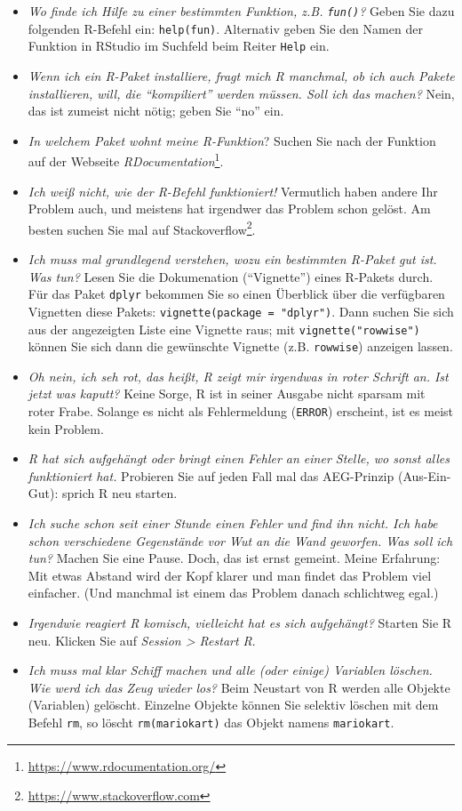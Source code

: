 \documentclass[
  a4paper,
]{scrbook}
\providecommand{\tightlist}{%
  \setlength{\itemsep}{0pt}\setlength{\parskip}{0pt}}\usepackage{longtable,booktabs,array}
\theoremstyle{definition}
\theoremstyle{definition}
\theoremstyle{definition}
\theoremstyle{remark}
\begin{document}
\begin{itemize}
\tightlist
\item
  \emph{Wo finde ich Hilfe zu einer bestimmten Funktion, z.B.
  \texttt{fun()}?} Geben Sie dazu folgenden R-Befehl ein:
  \texttt{help(fun)}. Alternativ geben Sie den Namen der Funktion in
  RStudio im Suchfeld beim Reiter \texttt{Help} ein.
\item
  \emph{Wenn ich ein R-Paket installiere, fragt mich R manchmal, ob ich
  auch Pakete installieren, will, die ``kompiliert'' werden müssen. Soll
  ich das machen?} Nein, das ist zumeist nicht nötig; geben Sie ``no''
  ein.
\item
  \emph{In welchem Paket wohnt meine R-Funktion}? Suchen Sie nach der
  Funktion auf der Webseite \emph{RDocumentation}\footnote{\url{https://www.rdocumentation.org/}}.
\item
  \emph{Ich weiß nicht, wie der R-Befehl funktioniert!} Vermutlich haben
  andere Ihr Problem auch, und meistens hat irgendwer das Problem schon
  gelöst. Am besten suchen Sie mal auf Stackoverflow\footnote{\url{https://www.stackoverflow.com}}.
\item
  \emph{Ich muss mal grundlegend verstehen, wozu ein bestimmten R-Paket
  gut ist. Was tun?} Lesen Sie die Dokumenation (``Vignette'') eines
  R-Pakets durch. Für das Paket \texttt{dplyr} bekommen Sie so einen
  Überblick über die verfügbaren Vignetten diese Pakets:
  \texttt{vignette(package\ =\ "dplyr")}. Dann suchen Sie sich aus der
  angezeigten Liste eine Vignette raus; mit \texttt{vignette("rowwise")}
  können Sie sich dann die gewünschte Vignette (z.B. \texttt{rowwise})
  anzeigen lassen.
\item
  \emph{Oh nein, ich seh rot, das heißt, R zeigt mir irgendwas in roter
  Schrift an. Ist jetzt was kaputt?} Keine Sorge, R ist in seiner
  Ausgabe nicht sparsam mit roter Frabe. Solange es nicht als
  Fehlermeldung (\texttt{ERROR}) erscheint, ist es meist kein Problem.
\item
  \emph{R hat sich aufgehängt oder bringt einen Fehler an einer Stelle,
  wo sonst alles funktioniert hat.} Probieren Sie auf jeden Fall mal das
  AEG-Prinzip (Aus-Ein-Gut): sprich R neu starten.
\item
  \emph{Ich suche schon seit einer Stunde einen Fehler und find ihn
  nicht. Ich habe schon verschiedene Gegenstände vor Wut an die Wand
  geworfen. Was soll ich tun?} Machen Sie eine Pause. Doch, das ist
  ernst gemeint. Meine Erfahrung: Mit etwas Abstand wird der Kopf klarer
  und man findet das Problem viel einfacher. (Und manchmal ist einem das
  Problem danach schlichtweg egal.)
\item
  \emph{Irgendwie reagiert R komisch, vielleicht hat es sich
  aufgehängt?} Starten Sie R neu. Klicken Sie auf \emph{Session
  \textgreater{} Restart R}.
\item
  \emph{Ich muss mal klar Schiff machen und alle (oder einige) Variablen
  löschen. Wie werd ich das Zeug wieder los?} Beim Neustart von R werden
  alle Objekte (Variablen) gelöscht. Einzelne Objekte können Sie
  selektiv löschen mit dem Befehl \texttt{rm}, so löscht
  \texttt{rm(mariokart)} das Objekt namens \texttt{mariokart}.
\end{itemize}
\end{document}
